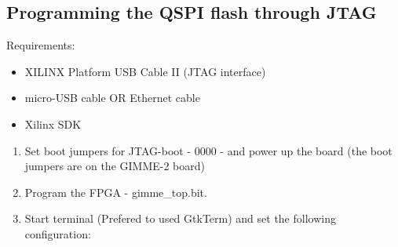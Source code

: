 \subsection{Programming the QSPI flash through JTAG}
\label{Programming_the_QSPI_flash_through_JTAG}
Requirements:
\begin{itemize}
\item XILINX Platform USB Cable II (JTAG interface)
\item micro-USB cable OR Ethernet cable
\item Xilinx SDK 
\end{itemize}
\begin{enumerate}

\item Set boot jumpers for JTAG-boot - 0000 - and power up the board (the boot jumpers are on the GIMME-2 board) \newline

\item Program the FPGA - gimme\_top.bit. 
\item Start terminal (Prefered to used GtkTerm) and set the following configuration: 



\end{enumerate}
